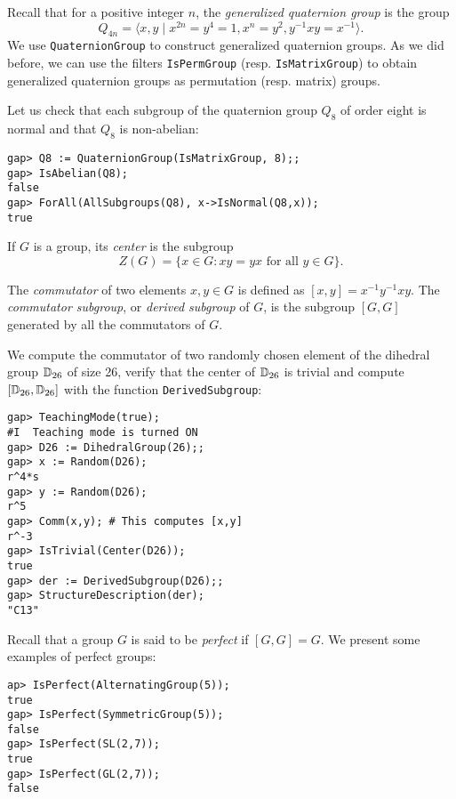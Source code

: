 Recall that for a positive integer $n$, the \emph{generalized quaternion group} is the group 
\[
Q_{4n}=\langle x,y \mid x^{2n} = y^4 = 1, x^n = y^2, y^{-1}xy = x^{-1}\rangle.
\]
We use \lstinline{QuaternionGroup} to construct generalized quaternion groups.
As we did before, we can use the filters \lstinline{IsPermGroup} (resp.
\lstinline{IsMatrixGroup}) to obtain generalized quaternion groups as
permutation (resp. matrix) groups. 

\begin{example}
	Let us check that each subgroup of the quaternion group $Q_8$ of order
	eight is normal and that $Q_8$ is non-abelian: 
\begin{lstlisting}
gap> Q8 := QuaternionGroup(IsMatrixGroup, 8);;                                        
gap> IsAbelian(Q8);
false
gap> ForAll(AllSubgroups(Q8), x->IsNormal(Q8,x));
true
\end{lstlisting}
\end{example}

If $G$ is a group, its \emph{center} is the subgroup
\[
	Z(G)=\{x\in G:xy=yx\text{ for all $y\in G$}\}.
\]

The \emph{commutator} of two elements $x,y\in G$ is defined as
$[x,y]=x^{-1}y^{-1}xy$. The \emph{commutator subgroup}, 
or \emph{derived subgroup} of $G$, is the subgroup $[G,G]$
generated by all the commutators of $G$.

\begin{example}
We compute the commutator of two randomly chosen element
of the dihedral group $\mathbb{D}_{26}$ of size 26, 
verify that the center of $\mathbb{D}_{26}$ is trivial and
compute $[\mathbb{D}_{26},\mathbb{D}_{26}]$ with 
the function \lstinline{DerivedSubgroup}:
\begin{lstlisting}
gap> TeachingMode(true);
#I  Teaching mode is turned ON
gap> D26 := DihedralGroup(26);;
gap> x := Random(D26);
r^4*s
gap> y := Random(D26);
r^5
gap> Comm(x,y); # This computes [x,y]
r^-3
gap> IsTrivial(Center(D26));
true    
gap> der := DerivedSubgroup(D26);;
gap> StructureDescription(der);
"C13"
\end{lstlisting}
\end{example}

\begin{example}
    Recall that a group $G$ is said to be \emph{perfect}
    if $[G,G]=G$. We present some examples of perfect groups:
\begin{lstlisting}
ap> IsPerfect(AlternatingGroup(5));
true
gap> IsPerfect(SymmetricGroup(5));
false
gap> IsPerfect(SL(2,7));
true
gap> IsPerfect(GL(2,7));
false
\end{lstlisting}
\end{example}

